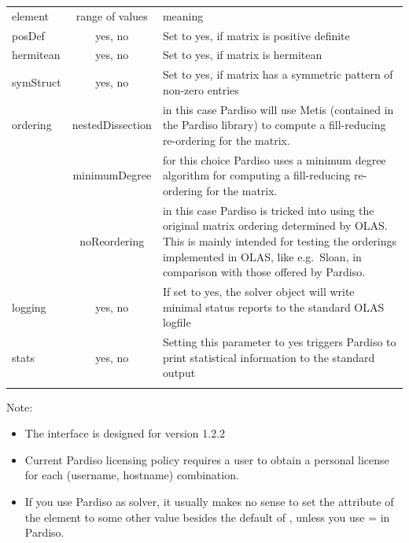 \begin{center}
\begin{longtable}{lcp{}}
\hline\noalign{\smallskip}
element & range of values & meaning \\
\noalign{\smallskip}\hline\noalign{\smallskip}
posDef     & yes, no & Set to yes, if matrix is positive definite\\
\noalign{\smallskip}\hline\noalign{\smallskip}
hermitean  & yes, no & Set to yes, if matrix is hermitean\\
\noalign{\smallskip}\hline\noalign{\smallskip}
symStruct  & yes, no & Set to yes, if matrix has a symmetric pattern
                       of non-zero entries\\
\noalign{\smallskip}\hline\noalign{\smallskip}
ordering & nestedDissection & in this case Pardiso will use Metis (contained
                              in the Pardiso library) to compute a
                              fill-reducing re-ordering for the matrix.\\
         & minimumDegree    & for this choice Pardiso uses a minimum degree
                              algorithm for computing a
                              fill-reducing re-ordering for the matrix.\\
         & noReordering     & in this case Pardiso is tricked into using the
                              original matrix ordering determined by OLAS.
                              This is mainly intended for testing the orderings
                              implemented in OLAS, like e.g.~Sloan, in
                              comparison with those offered by Pardiso.\\
\noalign{\smallskip}\hline\noalign{\smallskip}
logging    & yes, no & If set to yes, the solver object will write minimal
                       status reports to the standard OLAS logfile\\
\noalign{\smallskip}\hline\noalign{\smallskip}
stats      & yes, no & Setting this parameter to yes triggers Pardiso to print
                       statistical information to the standard output\\
\noalign{\smallskip}\hline
\end{longtable}
\end{center}
%
%
Note:
\begin{itemize}
\item The interface is designed for version 1.2.2
\item Current Pardiso licensing policy requires a user to obtain a personal
      license for each (username, hostname) combination.
\item If you use Pardiso as solver, it usually makes no sense to set
      the  attribute of the  element to some other
      value besides the default of , unless you use
       =  in Pardiso.
\end{itemize}
%
%
